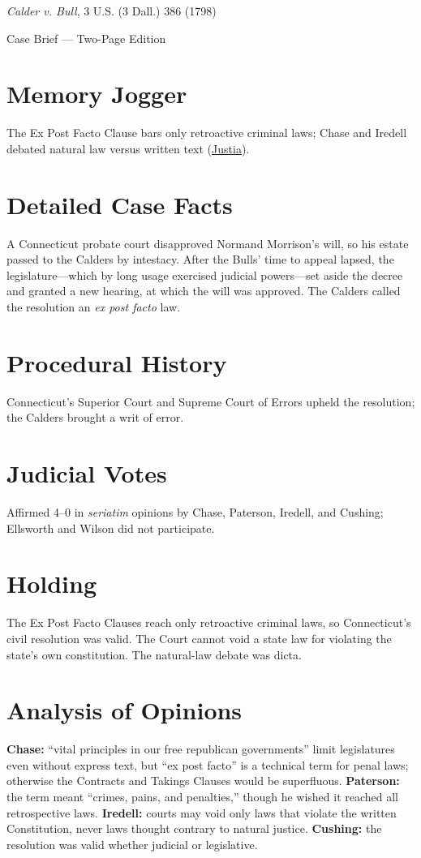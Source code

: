 \documentclass[12pt]{article}
\begin{document}
\begin{center}
{\LARGE \textit{Calder v. Bull}, 3 U.S. (3 Dall.) 386 (1798)\par}
\vspace{0.5em}
{\large Case Brief --- Two-Page Edition\par}
\end{center}

\section{Memory Jogger}
The Ex Post Facto Clause bars only retroactive criminal laws; Chase and Iredell debated natural law versus written text (\href{https://supreme.justia.com/cases/federal/us/3/386/}{Justia}).

\section{Detailed Case Facts}
A Connecticut probate court disapproved Normand Morrison's will, so his estate passed to the Calders by intestacy. After the Bulls' time to appeal lapsed, the legislature---which by long usage exercised judicial powers---set aside the decree and granted a new hearing, at which the will was approved. The Calders called the resolution an \textit{ex post facto} law.

\section{Procedural History}
Connecticut's Superior Court and Supreme Court of Errors upheld the resolution; the Calders brought a writ of error.

\section{Judicial Votes}
Affirmed 4--0 in \textit{seriatim} opinions by Chase, Paterson, Iredell, and Cushing; Ellsworth and Wilson did not participate.

\section{Holding}
The Ex Post Facto Clauses reach only retroactive criminal laws, so Connecticut's civil resolution was valid. The Court cannot void a state law for violating the state's own constitution. The natural-law debate was dicta.

\section{Analysis of Opinions}
\textbf{Chase:} ``vital principles in our free republican governments'' limit legislatures even without express text, but ``ex post facto'' is a technical term for penal laws; otherwise the Contracts and Takings Clauses would be superfluous. \textbf{Paterson:} the term meant ``crimes, pains, and penalties,'' though he wished it reached all retrospective laws. \textbf{Iredell:} courts may void only laws that violate the written Constitution, never laws thought contrary to natural justice. \textbf{Cushing:} the resolution was valid whether judicial or legislative.
\end{document}
